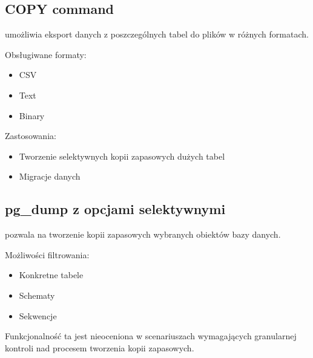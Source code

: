 \documentclass[letterpaper,10pt,polish]{sphinxmanual}
\begin{document}
\subsection{COPY command}
\label{\detokenize{kopie_zapasowe_i_odzyskiwanie_danych:copy-command}}
\sphinxAtStartPar
{} umożliwia eksport danych z poszczególnych tabel do plików w różnych formatach.

\sphinxAtStartPar
Obsługiwane formaty:
\begin{itemize}
\item {} 
\sphinxAtStartPar
CSV

\item {} 
\sphinxAtStartPar
Text

\item {} 
\sphinxAtStartPar
Binary

\end{itemize}

\sphinxAtStartPar
Zastosowania:
\begin{itemize}
\item {} 
\sphinxAtStartPar
Tworzenie selektywnych kopii zapasowych dużych tabel

\item {} 
\sphinxAtStartPar
Migracje danych

\end{itemize}


\subsection{pg\_dump z opcjami selektywnymi}
\label{\detokenize{kopie_zapasowe_i_odzyskiwanie_danych:pg-dump-z-opcjami-selektywnymi}}
\sphinxAtStartPar
{} pozwala na tworzenie kopii zapasowych wybranych obiektów bazy danych.

\sphinxAtStartPar
Możliwości filtrowania:
\begin{itemize}
\item {} 
\sphinxAtStartPar
Konkretne tabele

\item {} 
\sphinxAtStartPar
Schematy

\item {} 
\sphinxAtStartPar
Sekwencje

\end{itemize}

\sphinxAtStartPar
Funkcjonalność ta jest nieoceniona w scenariuszach wymagających granularnej kontroli nad procesem tworzenia kopii zapasowych.
\end{document}
